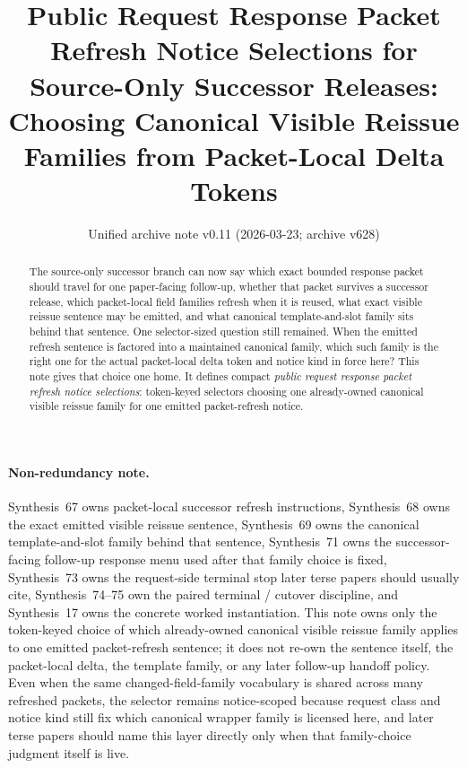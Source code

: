\documentclass[11pt]{article}
\title{Public Request Response Packet Refresh Notice Selections for Source-Only Successor Releases:\\[0.5ex]
\large Choosing Canonical Visible Reissue Families from Packet-Local Delta Tokens}
\author{}
\date{Unified archive note v0.11 (2026-03-23; archive v628)}
\begin{document}
\maketitle

\begin{abstract}
The source-only successor branch can now say which exact bounded response packet should travel for one paper-facing follow-up, whether that packet survives a successor release, which packet-local field families refresh when it is reused, what exact visible reissue sentence may be emitted, and what canonical template-and-slot family sits behind that sentence. One selector-sized question still remained. When the emitted refresh sentence is factored into a maintained canonical family, which such family is the right one for the actual packet-local delta token and notice kind in force here? This note gives that choice one home. It defines compact \emph{public request response packet refresh notice selections}: token-keyed selectors choosing one already-owned canonical visible reissue family for one emitted packet-refresh notice.
\end{abstract}

\paragraph{Non-redundancy note.}
Synthesis~67 owns packet-local successor refresh instructions, Synthesis~68 owns the exact emitted visible reissue sentence, Synthesis~69 owns the canonical template-and-slot family behind that sentence, Synthesis~71 owns the successor-facing follow-up response menu used after that family choice is fixed, Synthesis~73 owns the request-side terminal stop later terse papers should usually cite, Synthesis~74--75 own the paired terminal / cutover discipline, and Synthesis~17 owns the concrete worked instantiation.\cite{series:publicrequestresponsepacketdeltas,series:publicrequestresponsepacketrefreshnotices,series:publicrequestresponsepacketrefreshnoticenormalforms,series:publicrequestresponsepacketrefreshresponsemenus,series:publicrequestresponsepacketrefreshresponsepacketclosureverdicts,series:pairedterminalcitationdiscipline,series:pairedterminalcutoverrule,series:workedexample}
This note owns only the token-keyed choice of which already-owned canonical visible reissue family applies to one emitted packet-refresh sentence; it does not re-own the sentence itself, the packet-local delta, the template family, or any later follow-up handoff policy. Even when the same changed-field-family vocabulary is shared across many refreshed packets, the selector remains notice-scoped because request class and notice kind still fix which canonical wrapper family is licensed here, and later terse papers should name this layer directly only when that family-choice judgment itself is live.
\end{document}
